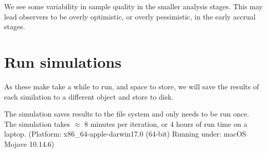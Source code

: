 \documentclass[
]{book}
\begin{document}
We see some variability in sample quality in the smaller analysis stages.
This may lead observers to be overly optimistic, or overly pessimistic,
in the early accrual stages.

\hypertarget{run-simulations}{%
\section{Run simulations}\label{run-simulations}}

As these make take a while to run, and space to store,
we will save the results of each similation to a different
object and store to disk.

The simulation saves results to the file system and
only needs to be run once. The simulation takes \(\approx\) 8 minutes
per iteration, or 4 hours of run time on a laptop.
(Platform: x86\_64-apple-darwin17.0 (64-bit)
Running under: macOS Mojave 10.14.6)
\end{document}

